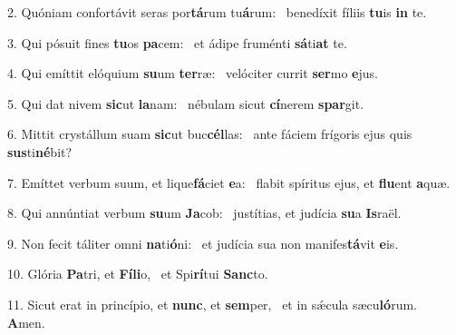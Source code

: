 2. Quóniam confortávit seras por\textbf{tá}rum tu\textbf{á}rum: \ast\  benedíxit fíliis \textbf{tu}is \textbf{in} te.\

3. Qui pósuit fines \textbf{tu}os \textbf{pa}cem: \ast\  et ádipe fruménti \textbf{sá}ti\textbf{at} te.\

4. Qui emíttit elóquium \textbf{su}um \textbf{ter}ræ: \ast\  velóciter currit \textbf{ser}mo \textbf{e}jus.\

5. Qui dat nivem \textbf{sic}ut \textbf{la}nam: \ast\  nébulam sicut \textbf{cí}nerem \textbf{spar}git.\

6. Mittit crystállum suam \textbf{sic}ut buc\textbf{cél}las: \ast\  ante fáciem frígoris ejus quis \textbf{sus}ti\textbf{né}bit?\

7. Emíttet verbum suum, et lique\textbf{fá}ciet \textbf{e}a: \ast\  flabit spíritus ejus, et \textbf{flu}ent \textbf{a}quæ.\

8. Qui annúntiat verbum \textbf{su}um \textbf{Ja}cob: \ast\  justítias, et judícia \textbf{su}a \textbf{Is}raël.\

9. Non fecit táliter omni \textbf{na}ti\textbf{ó}ni: \ast\  et judícia sua non manifes\textbf{tá}vit \textbf{e}is.\

10. Glória \textbf{Pa}tri, et \textbf{Fí}\textbf{li}o, \ast\  et Spi\textbf{rí}tui \textbf{Sanc}to.\

11. Sicut erat in princípio, et \textbf{nunc}, et \textbf{sem}per, \ast\  et in sǽcula sæcu\textbf{ló}rum. \textbf{A}men.\

